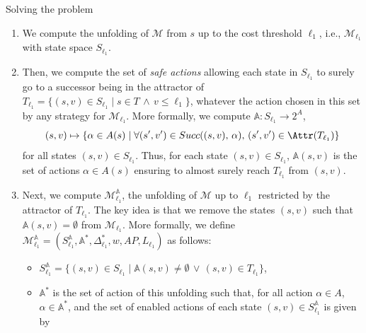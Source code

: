 \begin{algorithm}[H]
\caption{Solving the \SSPWE{} problem}\label{sspwe-algo}
\begin{enumerate}
  \item We compute the unfolding of $\mathcal{M}$ from $s$ up to the cost threshold $\ell_1$, i.e., $\mathcal{M}_{\ell_1}$ with state space $S_{\ell_1}$.
  \item Then, we compute the set of \textit{safe actions} allowing each state in $S_{\ell_1}$ to surely go to a successor being in the attractor of
  $T_{\ell_1} = \{ (s, v) \in S_{\ell_1} \; | \; s \in T \, \wedge \, v \leq \ell_1 \}$, whatever the action chosen in this set by any strategy for $\mathcal{M}_{\ell_1}$.
  More formally, we compute $\mathbb{A}: S_{\ell_1} \rightarrow 2^A$, \[ (s, v) \mapsto \{ \alpha \in A(s) \; | \; \forall (s', v') \in Succ((s, v), \, \alpha), \, (s', v') \in \Attr(T_{\ell_1}) \}\]
  for all states $(s, v) \in S_{\ell_1}$. Thus, for each state $(s, v) \in S_{\ell_1}$, $\mathbb{A}(s, v)$
  is the set of actions $\alpha \in A(s)$ ensuring to almost surely reach $T_{\ell_1}$ from $(s, v)$.
  \item Next, we compute $\mathcal{M}^\mathbb{A}_{\ell_1}$, the unfolding of $\mathcal{M}$ up to $\ell_1$ restricted by the attractor of $T_{\ell_1}$. The key idea is that we remove the states $(s, v)$ such that $\mathbb{A}(s, v) = \emptyset$ from $\mathcal{M}_{\ell_1}$. More formally,
  we define $\mathcal{M}^\mathbb{A}_{\ell_1} = (S^\mathbb{A}_{\ell_1}, \mathbb{A}^*, \Delta^*_{\ell_1}, w, AP, L_{\ell_1})$ as follows:
  \begin{itemize}
    \item $S^\mathbb{A}_{\ell_1} = \{ (s, v) \in S_{\ell_1} \; | \; \mathbb{A}(s, v) \neq \emptyset \, \vee \, (s, v) \in T_{\ell_1} \}$,
    \item $\mathbb{A}^*$ is the set of action of this unfolding such that, for all action $\alpha \in A$, $\alpha \in \mathbb{A}^*$, and the set of enabled actions of each state $(s, v) \in S^\mathbb{A}_{\ell_1}$ is given by %

\end{itemize}
\end{enumerate}
\end{algorithm}
